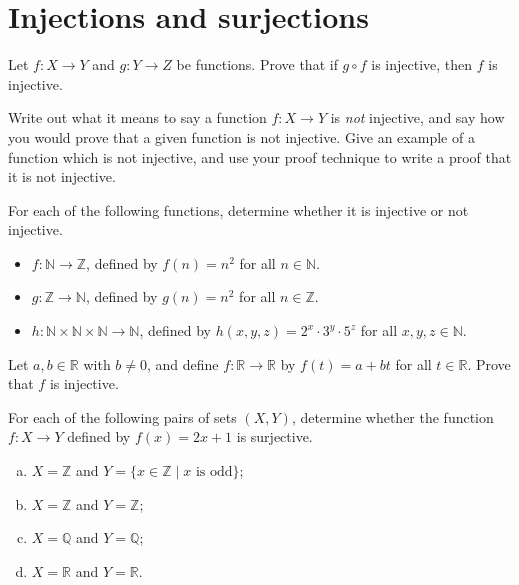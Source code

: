 \section{Injections and surjections}


\begin{exercise}
Let $f : X \to Y$ and $g : Y \to Z$ be functions. Prove that if $g \circ f$ is injective, then $f$ is injective.
\end{exercise}

\begin{exercise}
Write out what it means to say a function $f : X \to Y$ is \textit{not} injective, and say how you would prove that a given function is not injective. Give an example of a function which is not injective, and use your proof technique to write a proof that it is not injective.
\end{exercise}

\begin{exercise}
For each of the following functions, determine whether it is injective or not injective.
\begin{itemize} 
\item $f : \mathbb{N} \to \mathbb{Z}$, defined by $f(n)=n^2$ for all $n \in \mathbb{N}$.
\item $g : \mathbb{Z} \to \mathbb{N}$, defined by $g(n)=n^2$ for all $n \in \mathbb{Z}$.
\item $h : \mathbb{N} \times \mathbb{N} \times \mathbb{N} \to \mathbb{N}$, defined by $h(x,y,z) = 2^x \cdot 3^y \cdot 5^z$ for all $x,y,z \in \mathbb{N}$.
\end{itemize}
\end{exercise}

\begin{exercise}
\label{exLinearPolynomialIsInjective}
Let $a,b \in \mathbb{R}$ with $b \ne 0$, and define $f : \mathbb{R} \to \mathbb{R}$ by $f(t) = a+bt$ for all $t \in \mathbb{R}$. Prove that $f$ is injective.
\end{exercise}

\begin{exercise}
For each of the following pairs of sets $(X,Y)$, determine whether the function $f : X \to Y$ defined by $f(x)=2x+1$ is surjective.
\begin{enumerate}[(a)]
\item $X = \mathbb{Z}$ and $Y = \{ x \in \mathbb{Z} \mid x \text{ is odd} \}$;
\item $X = \mathbb{Z}$ and $Y = \mathbb{Z}$;
\item $X = \mathbb{Q}$ and $Y = \mathbb{Q}$;
\item $X = \mathbb{R}$ and $Y = \mathbb{R}$.
\end{enumerate}
\end{exercise}

